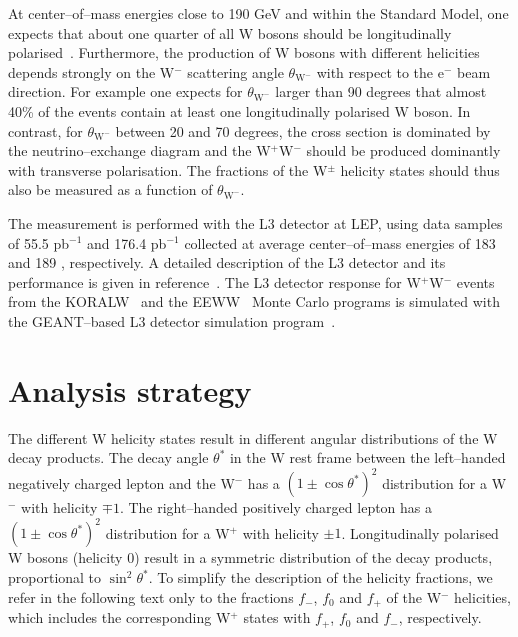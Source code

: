 \documentclass[12pt,a4paper,dvips]{article}
\begin{document}
At center--of--mass energies close to 190 GeV and within the Standard Model,
one expects that about one quarter of all W bosons should be    
longitudinally polarised~\cite{Hagiwara87}.
Furthermore, the production of W bosons with different helicities
depends strongly on the W$^{-}$ scattering angle $\theta_{\mathrm{W}^{-}}$
with respect to the e$^{-}$ beam direction.
For example one expects for $\theta_{\mathrm{W}^{-}}$
larger than 90 degrees that almost 40\% of the events contain at least one 
longitudinally polarised W boson. In contrast, for $\theta_{\mathrm{W}^{-}}$ 
between 20 and 70 degrees, the cross section is dominated by the 
neutrino--exchange diagram and the W$^{+}$W$^{-}$ 
should be produced dominantly with transverse polarisation. 
The fractions of the W$^{\pm}$ helicity states 
should thus also be measured as a function of $\theta_{\mathrm{W}^{-}}$.

The measurement is performed with the L3 detector at LEP, 
using data samples of 55.5 pb$^{-1}$ and 176.4 pb$^{-1}$
collected at average center--of--mass energies 
of 183 \GeV{} and 189 \GeV{}, respectively.
A detailed description of the L3 detector and its performance
is given in 
reference~\cite{l3_00}.
The L3 detector response for W$^{+}$W$^{-}$
events from the KORALW~\cite{KORALW1} 
and the EEWW~\cite{EEWW} Monte Carlo programs  
is simulated with the GEANT--based L3 detector simulation 
program~\cite{xgeant}.

\section*{Analysis strategy}

The different W helicity states result in different 
angular distributions of the W decay products.
The decay angle $\theta^{*}$ in the W rest frame
between the left--handed negatively charged lepton and the W$^{-}$ 
has a $(1 \pm \cos \theta^{*})^{2}$ 
distribution for a W$^{-}$ with helicity $\mp 1$. 
The right--handed positively charged lepton has a 
$(1 \pm \cos \theta^{*})^{2}$ distribution for a W$^{+}$ 
with helicity $\pm 1$.
Longitudinally polarised W bosons (helicity $0$)  
result in a symmetric distribution of the decay products,
proportional to $\sin^{2} \theta^{*}$.
To simplify the description of the 
helicity fractions, we refer in the following text only 
to the fractions $f_{-}$, $f_{0}$ and $f_{+}$ of the W$^{-}$ helicities, which 
includes the corresponding  
W$^{+}$ states with $f_{+}$, $f_{0}$ and $f_{-}$, respectively.
 
\end{document}
